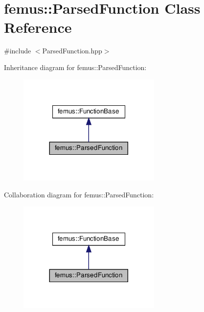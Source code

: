 \hypertarget{classfemus_1_1_parsed_function}{}\section{femus\+:\+:Parsed\+Function Class Reference}
\label{classfemus_1_1_parsed_function}


{\ttfamily \#include $<$Parsed\+Function.\+hpp$>$}



Inheritance diagram for femus\+:\+:Parsed\+Function\+:
\nopagebreak
\begin{figure}[H]
\begin{center}
\leavevmode
\includegraphics[width=200pt]{classfemus_1_1_parsed_function__inherit__graph}
\end{center}
\end{figure}


Collaboration diagram for femus\+:\+:Parsed\+Function\+:
\nopagebreak
\begin{figure}[H]
\begin{center}
\leavevmode
\includegraphics[width=200pt]{classfemus_1_1_parsed_function__coll__graph}
\end{center}
\end{figure}
